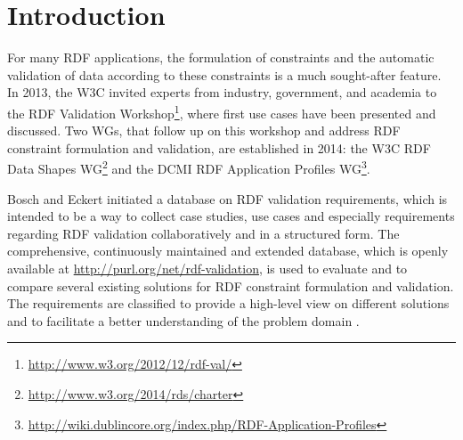 \documentclass{llncs}
\begin{document}
%
%

\section{Introduction}

For many RDF applications, the formulation of constraints and the automatic validation of data according to these constraints is a much sought-after feature. 
In 2013, the W3C invited experts from industry, government, and academia to the RDF Validation Workshop\footnote{\url{http://www.w3.org/2012/12/rdf-val/}}, 
where first use cases have been presented and discussed. 
Two WGs, that follow up on this workshop and address RDF constraint formulation and validation, are established in 2014: 
the W3C RDF Data Shapes WG\footnote{\url{http://www.w3.org/2014/rds/charter}} and the DCMI RDF Application Profiles WG\footnote{\url{http://wiki.dublincore.org/index.php/RDF-Application-Profiles}}. 

Bosch and Eckert \cite{BoschEckert2014} initiated a database on RDF validation requirements, which is intended to be a way to collect case studies, use cases and especially requirements regarding RDF validation collaboratively and in a structured form.
The comprehensive, continuously maintained and extended database, which is openly available at \url{http://purl.org/net/rdf-validation}, is used to evaluate and to compare several existing solutions for RDF constraint formulation and validation. 
The requirements are classified to provide a high-level view on different solutions and to facilitate a better understanding of the problem domain \cite{BoschEckert2014}.  
\end{document}
